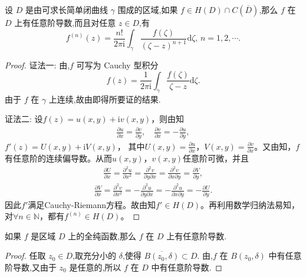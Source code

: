 \documentclass[../../main.tex]{subfiles}%
\begin{document}
\begin{theorem}\label{theorem:定理3.4.3}
设 \( D \) 是由可求长简单闭曲线 \( \gamma \) 围成的区域,如果 \( f \in H(D) \cap C(\overline{D}) \),那么 \( f \) 在 \( D \) 上有任意阶导数,而且对任意 \( z \in D \),有
\[
f^{(n)}(z) = \frac{n!}{2\pi \mathrm{i}} \int_{\gamma} \frac{f(\zeta)}{(\zeta - z)^{n + 1}} \mathrm{d}\zeta, \, n = 1, 2, \cdots.
\]
\end{theorem}
\begin{proof}

{\color{blue}证法一:}
由,\( f \) 可写为 Cauchy 型积分
\[
f(z) = \frac{1}{2\pi \mathrm{i}} \int_{\gamma} \frac{f(\zeta)}{\zeta - z} \mathrm{d}\zeta.
\]
由于 \( f \) 在 \( \gamma \) 上连续,故由即得所要证的结果. 

{\color{blue}证法二:}
设\( f(z) = u(x,y) + \mathrm{i}v(x,y) \)，则由知
\begin{align*}
\frac{\partial u}{\partial x} = \frac{\partial v}{\partial y},\quad \frac{\partial v}{\partial x} = -\frac{\partial u}{\partial y},
\end{align*}
\( f'(z) = U(x,y) + \mathrm{i}V(x,y) \)，
其中\( U(x,y) = \frac{\partial u}{\partial x} \)，\( V(x,y) = \frac{\partial v}{\partial x} \)。又由知，\( f \)有任意阶的连续偏导数。从而\( u(x,y) \)，\( v(x,y) \)任意阶可微，并且
\begin{align*}
\frac{\partial U}{\partial x} = \frac{\partial^2 u}{\partial x^2} = \frac{\partial^2 v}{\partial y \partial x} = \frac{\partial^2 v}{\partial x \partial y} = \frac{\partial V}{\partial y},
\end{align*}
\begin{align*}
\frac{\partial V}{\partial x} = \frac{\partial^2 v}{\partial x^2} = -\frac{\partial^2 u}{\partial y \partial x} = -\frac{\partial^2 u}{\partial x \partial y} = -\frac{\partial U}{\partial y}.
\end{align*}
因此\( f' \)满足Cauchy-Riemann方程。故由知\( f' \in H(D) \)。再利用数学归纳法易知，对\( \forall n \in \mathbb{N} \)，都有\( f^{(n)} \in H(D) \)。

\end{proof}

\begin{theorem}\label{theorem:定理3.4.4}
如果 \( f \) 是区域 \( D \) 上的全纯函数,那么 \( f \) 在 \( D \) 上有任意阶导数.
\end{theorem}
\begin{proof}

任取 \( z_0 \in D \),取充分小的 \( \delta \),使得 \( \overline{B(z_0, \delta)} \subset D \). 由,\( f \) 在 \( B(z_0, \delta) \) 中有任意阶导数,又由于 \( z_0 \) 是任意的,所以 \( f \) 在 \( D \) 中有任意阶导数.

\end{proof}
\end{document}
